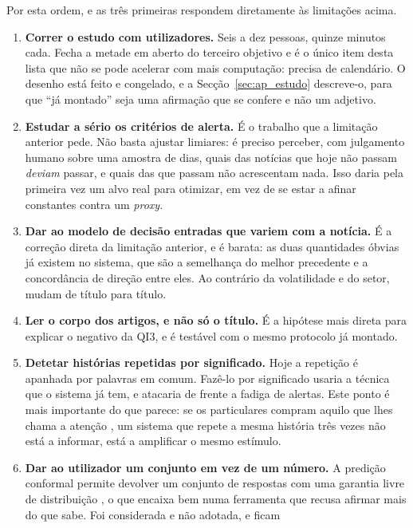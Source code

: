 Por esta ordem, e as três primeiras respondem diretamente às limitações acima.

\begin{enumerate}
  \item \textbf{Correr o estudo com utilizadores.} Seis a dez pessoas, quinze minutos cada. Fecha a
        metade em aberto do terceiro objetivo e é o único item desta lista que não se pode acelerar com mais
        computação: precisa de calendário. O desenho está feito e congelado, e a
        Secção~\ref{sec:ap_estudo} descreve-o, para que ``já montado'' seja uma afirmação que se
        confere e não um adjetivo.
  \item \textbf{Estudar a sério os critérios de alerta.} É o trabalho que a limitação anterior pede.
        Não basta ajustar limiares: é preciso perceber, com julgamento humano sobre uma amostra de
        dias, quais das notícias que hoje não passam \emph{deviam} passar, e quais das que passam não
        acrescentam nada. Isso daria pela primeira vez um alvo real para otimizar, em vez de se
        estar a afinar constantes contra um \emph{proxy}.
  \item \textbf{Dar ao modelo de decisão entradas que variem com a notícia.} É a correção direta da
        limitação anterior, e é barata: as duas quantidades óbvias já existem no sistema, que são a
        semelhança do melhor precedente e a concordância de direção entre eles. Ao contrário da
        volatilidade e do setor, mudam de título para título.
  \item \textbf{Ler o corpo dos artigos, e não só o título.} É a hipótese mais direta para explicar
        o negativo da QI3, e é testável com o mesmo protocolo já montado.
  \item \textbf{Detetar histórias repetidas por significado.} Hoje a repetição é apanhada por
        palavras em comum. Fazê-lo por significado usaria a técnica que o sistema já tem, e atacaria
        de frente a fadiga de alertas. Este ponto é mais importante do que parece: se os
        particulares compram aquilo que lhes chama a atenção \autocite{barber2008glitters}, um
        sistema que repete a mesma história três vezes não está a informar, está a amplificar o
        mesmo estímulo.
  \item \textbf{Dar ao utilizador um conjunto em vez de um número.} A predição conformal permite
        devolver um conjunto de respostas com uma garantia livre de distribuição
        \autocite{vovk2005algorithmic, angelopoulos2023conformal}, o que encaixa bem numa
        ferramenta que recusa afirmar mais do que sabe. Foi considerada e não adotada, e ficam

\end{enumerate}
